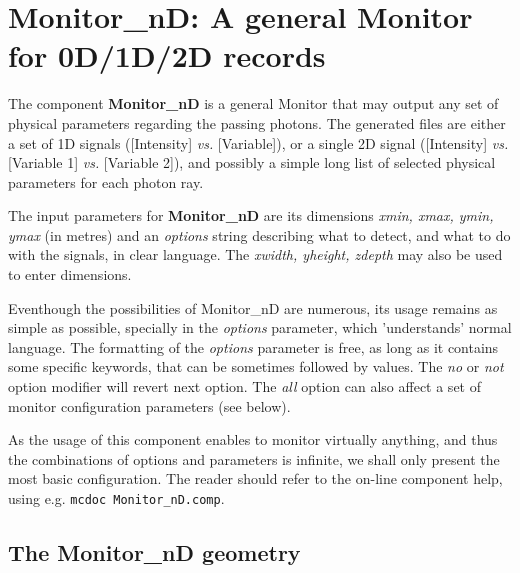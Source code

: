 \section{Monitor\_nD: A general Monitor for 0D/1D/2D records}
\label{s:monitornd}

The component \textbf{Monitor\_nD} is a general Monitor that may output any
set of physical parameters regarding the passing photons. The
generated files are either a set of 1D signals ([Intensity] \textit{vs.}
[Variable]), or a single 2D signal ([Intensity] \textit{vs.} [Variable 1]
\textit{vs.} [Variable 2]), and possibly a simple long list of selected
physical parameters for each photon ray.

The input parameters for \textbf{Monitor\_nD} are its dimensions \textit{xmin, xmax, ymin, ymax} (in metres) and an \textit{
  options} string describing what to detect, and what to do with the
signals, in clear language. The \textit{xwidth, yheight, zdepth} may also be used to enter dimensions.

Eventhough the possibilities of Monitor\_nD are numerous, its usage remains as simple as possible, specially in the \textit{options} parameter, which 'understands' normal language.
The formatting of the \textit{options}
parameter is free, as long as it contains some specific keywords, that
can be sometimes followed by values. The \textit{no} or \textit{not} option
modifier will revert next option. The \textit{all} option can also affect a
set of monitor configuration parameters (see below).

As the usage of this component enables to monitor virtually anything, and thus the combinations of options and parameters is infinite, we shall only present the most basic configuration. The reader should refer to the on-line component help, using e.g. \verb+mcdoc Monitor_nD.comp+.

\subsection{The Monitor\_nD geometry}

